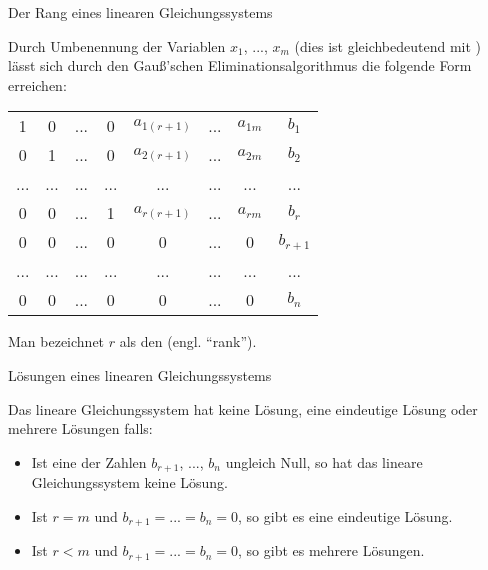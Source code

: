 \documentclass[german]{beamer}
\newcommand{\superalert}[1]{{\color{MyYellowOrange}{#1}}}
\begin{document}
\begin{frame}{Der Rang eines linearen Gleichungssystems}

Durch \alert{Umbenennung der Variablen} $x_1$, ..., $x_m$ (dies ist gleichbedeutend mit \superalert{Spaltenvertauschungen}) l\"a{ss}t sich durch den
Gau{\ss}'schen Eliminationsalgorithmus die folgende Form erreichen:
\begin{center}
\begin{tabular}{ccccccc|c}
1 & 0 & ... & 0 & $a_{1(r+1)}$ & ... & $a_{1m}$ & $b_1$ \\
0 & 1 & ... & 0 & $a_{2(r+1)}$ & ... & $a_{2m}$ & $b_2$ \\
... & ... & ... & ... & ... & ... & ... & ... \\
0 & 0 & ... & 1 & $a_{r(r+1)}$ & ... & $a_{rm}$ & $b_r$ \\
0 & 0 & ... & 0 & 0 & ... & 0 & $b_{r+1}$ \\
... & ... & ... & ... & ... & ... & ... & ... \\
0 & 0 & ... & 0 & 0 & ... & 0 & $b_{n}$ \\
\end{tabular}
\end{center}
Man bezeichnet $r$ als den \superalert{Rang} (engl. ``rank'').

\end{frame}

\begin{frame}{L\"osungen eines linearen Gleichungssystems}

Das lineare Gleichungssystem
hat keine L\"osung, eine eindeutige L\"osung oder mehrere
L\"osungen falls:
\begin{itemize}
\item Ist eine der Zahlen $b_{r+1}$, ..., $b_n$ ungleich Null, so hat das lineare Gleichungssystem \alert{keine L\"osung}.
\item Ist $r=m$ und $b_{r+1}=...=b_n=0$, so gibt es eine \alert{eindeutige L\"osung}.
\item Ist $r<m$ und $b_{r+1}=...=b_n=0$, so gibt es \alert{mehrere L\"osungen}.
\end{itemize}
\end{frame}
\end{document}
